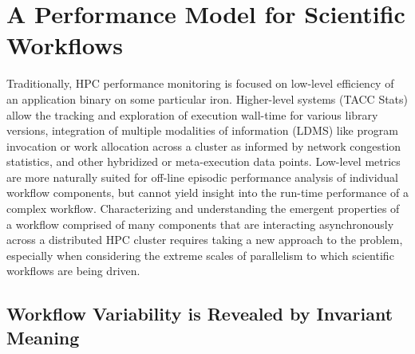 \documentclass[10pt, conference, compsocconf]{IEEEtran}
\begin{document}
\section{A Performance Model for Scientific Workflows}
Traditionally, HPC performance monitoring is focused on low-level efficiency of 
an application binary on some particular iron.  Higher-level systems (TACC 
Stats) allow the tracking and exploration of execution wall-time for various 
library versions, integration of multiple modalities of information (LDMS) like 
program invocation or work allocation across a cluster as informed by network 
congestion statistics, and other hybridized or meta-execution data points. 
Low-level metrics are more naturally suited for off-line episodic 
performance analysis of individual workflow components, but cannot yield insight 
into the run-time performance of a complex workflow.  Characterizing and 
understanding the emergent properties of a workflow comprised 
of many components that are interacting asynchronously across a distributed HPC 
cluster requires taking a new approach to the problem, especially when 
considering the extreme scales of parallelism to which scientific workflows are 
being driven. 
\subsection{Workflow Variability is Revealed by Invariant Meaning}
\end{document}
